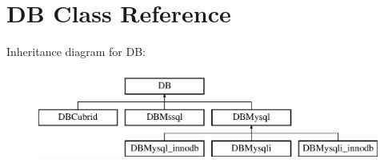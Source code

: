 \hypertarget{classDB}{\section{D\+B Class Reference}
\label{classDB}
}
Inheritance diagram for D\+B\+:\begin{figure}[H]
\begin{center}
\leavevmode
\includegraphics[height=3.000000cm]{classDB}
\end{center}
\end{figure}

